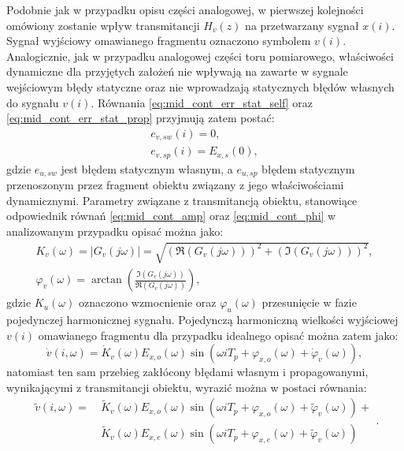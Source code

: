 Podobnie jak w przypadku opisu części analogowej, w pierwszej kolejności omówiony zostanie wpływ transmitancji $H_{v}(z)$ na przetwarzany sygnał $x(i)$. Sygnał wyjściowy omawianego fragmentu oznaczono symbolem $v(i)$. Analogicznie, jak w przypadku analogowej części toru pomiarowego, właściwości dynamiczne dla przyjętych założeń nie wpływają na zawarte w sygnale wejściowym błędy statyczne oraz nie wprowadzają statycznych błędów własnych do sygnału $v(i)$. Równania \eqref{eq:mid_cont_err_stat_self} oraz \eqref{eq:mid_cont_err_stat_prop} przyjmują zatem postać:
\begin{gather}
e_{v,sw} \left( i \right) = 0 \label{eq:mid_disc_err_stat_self}, \\
e_{v,sp} \left( i \right) = E_{x,s} \left( 0 \right) \label{eq:mid_disc_err_stat_prop},
\end{gather}
gdzie $e_{u,sw}$ jest błędem statycznym własnym, a $e_{u,sp}$ błędem statycznym przenoszonym przez fragment obiektu związany z jego właściwościami dynamicznymi. Parametry związane z transmitancją obiektu, stanowiące odpowiednik równań \eqref{eq:mid_cont_amp} oraz \eqref{eq:mid_cont_phi} w analizowanym przypadku opisać można jako:
\begin{gather}
K_{v} \left( \omega \right) = \left| G_{v} \left( j\omega \right) \right| = \sqrt{\left( \Re \left( G_{v} \left( j\omega \right) \right) \right)^{2} + \left( \Im \left( G_{v} \left( j\omega \right) \right) \right)^{2}} \label{eq:mid_disc_amp}, \\
\varphi_{v} \left( \omega \right) = \arctan \left( \frac{\Im \left( G_{v} \left( j\omega \right) \right)}{\Re \left( G_{v} \left( j\omega \right) \right)} \right) \label{eq:mid_disc_phi},
\end{gather}
gdzie $K_{u}(\omega)$ oznaczono wzmocnienie oraz $\varphi_{u}(\omega)$ przesunięcie w fazie pojedynczej harmonicznej sygnału. Pojedynczą harmoniczną wielkości wyjściowej $v(i)$ omawianego fragmentu dla przypadku idealnego opisać można zatem jako:
\begin{equation}
\dot{v} \left( i,\omega \right) = \dot{K}_{v} \left( \omega \right) E_{x,o} \left( \omega \right) \sin \left( \omega iT_{p} + \varphi_{x,o} \left( \omega \right) + \dot{\varphi}_{v} \left( \omega \right) \right) \label{eq:mid_disc_omega_ideal},
\end{equation}
natomiast ten sam przebieg zakłócony błędami własnym i propagowanymi, wynikającymi z transmitancji obiektu, wyrazić można w postaci równania:
\begin{equation}
\begin{split}
\tilde{v} \left( i,\omega \right) = ~
& \tilde{K}_{v} \left( \omega \right) E_{x,o} \left( \omega \right) \sin \left( \omega iT_{p} + \varphi_{x,o} \left( \omega \right) + \tilde{\varphi}_{v} \left( \omega \right) \right) + \\
& \tilde{K}_{v} \left( \omega \right) E_{x,e} \left( \omega \right) \sin \left( \omega iT_{p} + \varphi_{x,e} \left( \omega \right) + \tilde{\varphi}_{v} \left( \omega \right) \right)
\end{split}
\label{eq:mid_disc_omega_real}.
\end{equation}

